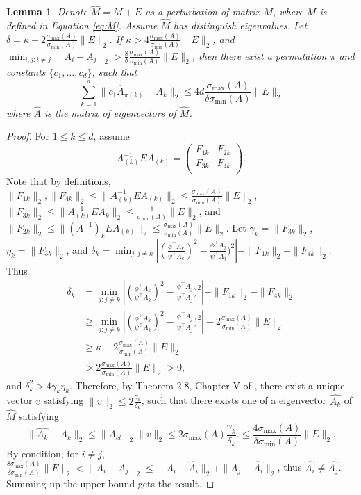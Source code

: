 \documentclass[english]{article} %
\newtheorem{lemma}{Lemma}[section]
\theoremstyle{definition}
\begin{document}
\begin{lemma}
\label{lem:eigenvectorvariation}
Denote $\widehat{M} = M+E$ as a perturbation of matrix $M$, where $M$ is defined in Equation \eqref{eq:M}. 
Assume $\widehat{M}$ has distinguish eigenvalues. Let $\delta = \kappa -  2 \frac{\sigma_{\max}(A)}{\sigma_{\min}(A)}\|E\|_2$. 
If $\kappa > 4 \frac{\sigma_{\max}(A)}{\sigma_{\min}(A)}\|E\|_2$, and $\min_{i,j:i\neq j} \|A_i - A_j\|_2 > \frac{8}{\delta}\frac{\sigma_{\max}(A)}{\sigma_{\min}(A) } \|E\|_2$, then there exist a permutation $\pi$ and constants $\{c_1,\ldots,c_d\}$, such that 
\[
\sum_{k=1}^{d}\| c_1\widehat{A}_{\pi(k)} - A_k\|_2 \le 4d  \frac{\sigma_{\max}(A)}{\delta \sigma_{\min}(A) } \|E\|_2
\]
where $\widehat{A}$ is the matrix of eigenvectors of $\widehat{M}$. 
\end{lemma}

\begin{proof}
For $1\le k\le d$, assume 
\[
A_{(k)}^{-1} E A_{(k)} =  
\left(
\begin{array}{cc}
F_{1k} & F_{2k}\\
F_{3k} & F_{4k} \\
\end{array} 
\right). 
\] 
Note that by definitions, $\|F_{1k}\|_2,\|F_{4k}\|_2\le\|A_{(k)}^{-1} E A_{(k)}\|_2\le\frac{\sigma_{\max}(A)}{\sigma_{\min}(A)}\|E\|_2$,
 $\|F_{3k}\|_2\le\|A_{(k)}^{-1}EA_{k}\|_2\le\frac{1}{\sigma_{\min}(A)}\|E\|_2$,
 and $\|F_{2k}\|_2\le\|(A^{-1})_kEA_{(k)}\|_2\le\frac{\sigma_{\max}(A)}{\sigma_{\min}(A)}\|E\|_2$.
Let $\gamma_k = \|F_{3k}\|_2$, $\eta_k = \|F_{3k}\|_2$, and $\delta_k = \min_{j: j\neq k} 
\left\vert (\frac{\phi^{\top}A_k}{\psi^{\top}A_k})^2 - \frac{\phi^{\top}A_j}{\psi^{\top}A_j})^2 \right\vert - \|F_{1k}\|_2 - \|F_{4k}\|_2$. Thus 
\begin{align*}
\delta_k & = \min_{j:j\neq k} 
	\left\vert (\frac{\phi^{\top}A_k}{\psi^{\top}A_k})^2 - \frac{\phi^{\top}A_j}{\psi^{\top}A_j})^2 \right\vert - \|F_{1k}\|_2 - \|F_{4k}\|_2\\
	& \ge \min_{j:j\neq k} \left\vert (\frac{\phi^{\top}A_k}{\psi^{\top}A_k})^2 - \frac{\phi^{\top}A_j}{\psi^{\top}A_j})^2 \right\vert - 2 \frac{\sigma_{\max}(A)}{\sigma_{\min}(A)}\|E\|_2\\
	& \ge  \kappa -  2 \frac{\sigma_{\max}(A)}{\sigma_{\min}(A)}\|E\|_2\\
	& >  2 \frac{\sigma_{\max}(A)}{\sigma_{\min}(A)}\|E\|_2 >0,
\end{align*}
and $\delta_k^2 > 4\gamma_k\eta_k$. 
Therefore, by Theorem 2.8, Chapter V of \citep{stewart1990matrix}, there exist a unique vector $v$ satisfying $\|v\|_2\le 2\frac{\gamma_k}{\delta_k}$, such that there exists one of a eigenvector $\widehat{A_k}$ of $\widehat{M}$ satisfying
 \[
 \|\widehat{A_k} - A_k\|_2 \le \|A_{ct}\|_2 \|v\|_2 \le 2\sigma_{\max}(A)\frac{\gamma_k}{\delta_k}.\le \frac{4\sigma_{\max}(A)}{\delta \sigma_{\min}(A) } \|E\|_2.
 \]
 By condition, for $i\neq j$,  $\frac{8\sigma_{\max}(A)}{\delta \sigma_{\min}(A) } \|E\|_2 < \|A_i - A_j\|_2\le \|A_i - \widehat{A_i}\|_2 + \|A_j - \widehat{A_i}\|_2$, thus $\widehat{A_i} \neq \widehat{A_j}$.  Summing up the upper bound gets the result. 
\end{proof}
\end{document}
